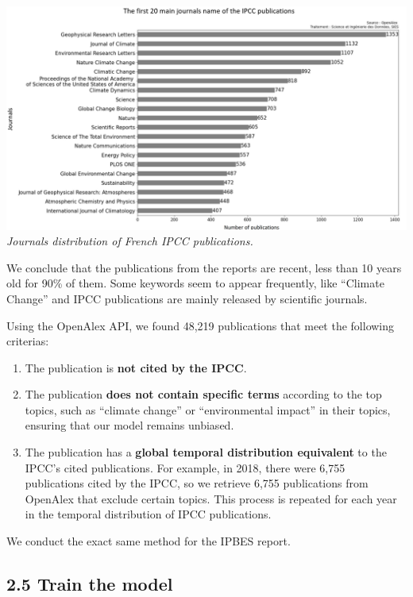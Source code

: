 \documentclass[
]{article}
\providecommand{\tightlist}{%
  \setlength{\itemsep}{0pt}\setlength{\parskip}{0pt}}
\begin{document}
\includegraphics{./images/locations_distribution_IPCC_model.png}
\emph{Journals distribution of French IPCC publications.}

We conclude that the publications from the reports are recent, less than
10 years old for 90\% of them. Some keywords seem to appear frequently,
like ``Climate Change'' and IPCC publications are mainly released by
scientific journals.

Using the OpenAlex API, we found 48,219 publications that meet the
following criterias:

\begin{enumerate}
\def\labelenumi{\arabic{enumi}.}
\tightlist
\item
  The publication is \textbf{not cited by the IPCC}.
\item
  The publication \textbf{does not contain specific terms} according to
  the top topics, such as ``climate change'' or ``environmental impact''
  in their topics, ensuring that our model remains unbiased.
\item
  The publication has a \textbf{global temporal distribution equivalent}
  to the IPCC's cited publications. For example, in 2018, there were
  6,755 publications cited by the IPCC, so we retrieve 6,755
  publications from OpenAlex that exclude certain topics. This process
  is repeated for each year in the temporal distribution of IPCC
  publications.
\end{enumerate}

We conduct the exact same method for the IPBES report.

\hypertarget{train-the-model}{%
\subsection{2.5 Train the model}\label{train-the-model}}
\end{document}
